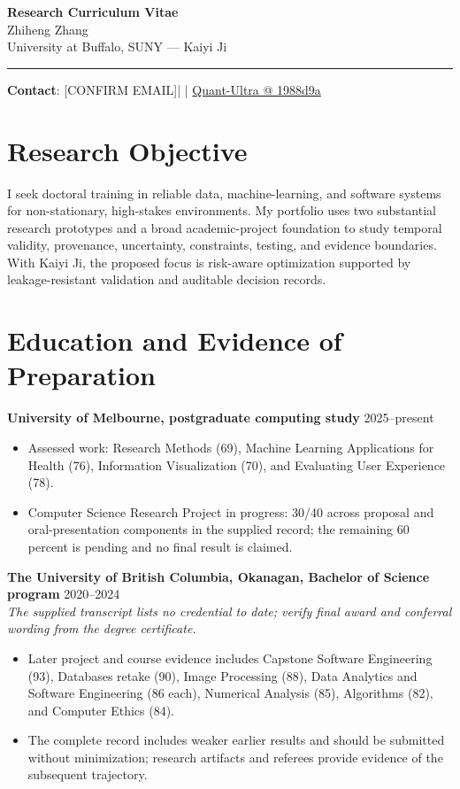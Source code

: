 \documentclass[11pt]{article}
\makeatletter
\newcommand{\ApplicantName}{Zhiheng Zhang}
\newcommand{\ApplicantEmail}{[CONFIRM EMAIL]}
\newcommand{\ApplicantPhone}{[CONFIRM PHONE]}
\newcommand{\ApplicantGitHub}{\href{https://github.com/zhiheng-zhang-Mera/Quant-Ultra/tree/1988d9a8530da91a8158de864d098ea869098923}{Quant-Ultra @ 1988d9a}}
\makeatother
\begin{document}
\begin{center}
{\LARGE\bfseries Research Curriculum Vitae}\\[0.25em]
{\large \ApplicantName}\\
University at Buffalo, SUNY --- Kaiyi Ji
\end{center}
\vspace{0.35em}\hrule\vspace{0.65em}

\textbf{Contact}: \ApplicantEmail\quad | \quad \ApplicantPhone\quad | \quad \ApplicantGitHub

\section*{Research Objective}
I seek doctoral training in reliable data, machine-learning, and software systems for non-stationary, high-stakes environments. My portfolio uses two substantial research prototypes and a broad academic-project foundation to study temporal validity, provenance, uncertainty, constraints, testing, and evidence boundaries. With Kaiyi Ji, the proposed focus is risk-aware optimization supported by leakage-resistant validation and auditable decision records.

\section*{Education and Evidence of Preparation}
\textbf{University of Melbourne, postgraduate computing study} \hfill 2025--present
\begin{itemize}
\item Assessed work: Research Methods (69), Machine Learning Applications for Health (76), Information Visualization (70), and Evaluating User Experience (78).
\item Computer Science Research Project in progress: 30/40 across proposal and oral-presentation components in the supplied record; the remaining 60 percent is pending and no final result is claimed.
\end{itemize}

\textbf{The University of British Columbia, Okanagan, Bachelor of Science program} \hfill 2020--2024\\
\textit{The supplied transcript lists no credential to date; verify final award and conferral wording from the degree certificate.}
\begin{itemize}
\item Later project and course evidence includes Capstone Software Engineering (93), Databases retake (90), Image Processing (88), Data Analytics and Software Engineering (86 each), Numerical Analysis (85), Algorithms (82), and Computer Ethics (84).
\item The complete record includes weaker earlier results and should be submitted without minimization; research artifacts and referees provide evidence of the subsequent trajectory.
\end{itemize}
\end{document}

